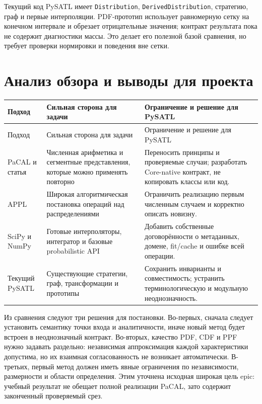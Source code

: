 \documentclass[12pt,a4paper]{article}
\begin{document}
Текущий код PySATL \cite{core} имеет \texttt{Distribution}, \texttt{DerivedDistribution}, стратегию, граф и первые интерполяции. PDF-прототип использует равномерную сетку на конечном интервале и обрезает отрицательные значения; контракт результата пока не содержит диагностики массы. Это делает его полезной базой сравнения, но требует проверки нормировки и поведения вне сетки.

\section{Анализ обзора и выводы для проекта}
\begin{longtable}{p{}p{}p{}}
\toprule
Подход & Сильная сторона для задачи & Ограничение и решение для PySATL \\
\midrule
\endfirsthead
\toprule
Подход & Сильная сторона для задачи & Ограничение и решение для PySATL \\
\midrule
\endhead
PaCAL и статья \cite{jaroszewicz2012,pacal} & Численная арифметика и сегментные представления, которые можно применять повторно & Переносить принципы и проверяемые случаи; разработать Core-native контракт, не копировать классы или код. \\
APPL \cite{drew2017} & Широкая алгоритмическая постановка операций над распределениями & Ограничить реализацию первым численным случаем и корректно описать новизну. \\
SciPy и NumPy \cite{scipyrv,scipypchip,scipyquad,numpycheb} & Готовые интерполяторы, интегратор и базовые probabilistic API & Добавить собственные договорённости о метаданных, домене, fit/cache и ошибке всей операции. \\
Текущий PySATL \cite{core} & Существующие стратегии, граф, трансформации и прототипы & Сохранить инварианты и совместимость; устранить терминологическую и модульную неоднозначность. \\
\bottomrule
\end{longtable}

Из сравнения следуют три решения для постановки. Во-первых, сначала следует установить семантику точки входа и аналитичности, иначе новый метод будет встроен в неоднозначный контракт. Во-вторых, качество PDF, CDF и PPF нужно задавать раздельно: независимая аппроксимация каждой характеристики допустима, но их взаимная согласованность не возникает автоматически. В-третьих, первый метод должен иметь явные ограничения по независимости, размерности и области определения. Этим уточнена исходная широкая цель epic: учебный результат не обещает полной реализации PaCAL, зато содержит законченный проверяемый срез.
\end{document}
